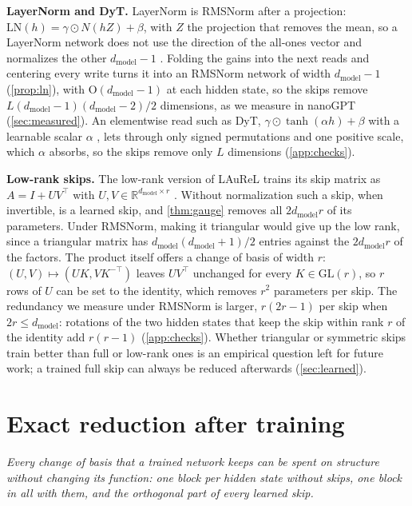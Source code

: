 \documentclass[10pt]{article}
\theoremstyle{definition}
\theoremstyle{remark}
\newcommand{\R}{\mathbb{R}}
\newcommand{\dm}{d_{\mathrm{model}}}
\newcommand{\GL}{\mathrm{GL}}
\newcommand{\Ort}{\mathrm{O}}
\newcommand{\para}[1]{\smallskip\noindent\textbf{#1}\hspace{0.5em}}
\newcommand{\takeaway}[1]{\noindent\textit{#1}\par\smallskip}
\begin{document}
\para{LayerNorm and DyT.} LayerNorm is RMSNorm after a projection: $\mathrm{LN}(h) = \gamma \odot N(hZ) + \beta$, with $Z$ the projection that removes the mean, so a LayerNorm network does not use the direction of the all-ones vector and normalizes the other $\dm - 1$ \citep{ashkboos2024slicegpt,theus2025glmc,baroni2026lnfree}. Folding the gains into the next reads and centering every write turns it into an RMSNorm network of width $\dm - 1$ (\cref{prop:ln}), with $\Ort(\dm-1)$ at each hidden state, so the skips remove $L(\dm-1)(\dm-2)/2$ dimensions, as we measure in nanoGPT (\cref{sec:measured}). An elementwise read such as DyT, $\gamma \odot \tanh(\alpha h) + \beta$ with a learnable scalar $\alpha$ \citep{zhu2025dyt}, lets through only signed permutations and one positive scale, which $\alpha$ absorbs, so the skips remove only $L$ dimensions (\cref{app:checks}).


\para{Low-rank skips.} The low-rank version of LAuReL trains its skip matrix as $A = I + UV^\top$ with $U, V \in \R^{\dm\times r}$ \citep{menghani2024laurel}. Without normalization such a skip, when invertible, is a learned skip, and \cref{thm:gauge} removes all $2\dm r$ of its parameters. Under RMSNorm, making it triangular would give up the low rank, since a triangular matrix has $\dm(\dm+1)/2$ entries against the $2\dm r$ of the factors. The product itself offers a change of basis of width $r$: $(U, V) \mapsto (UK, VK^{-\top})$ leaves $UV^\top$ unchanged for every $K \in \GL(r)$, so $r$ rows of $U$ can be set to the identity, which removes $r^2$ parameters per skip. The redundancy we measure under RMSNorm is larger, $r(2r-1)$ per skip when $2r \le \dm$: rotations of the two hidden states that keep the skip within rank $r$ of the identity add $r(r-1)$ (\cref{app:checks}). Whether triangular or symmetric skips train better than full or low-rank ones is an empirical question left for future work; a trained full skip can always be reduced afterwards (\cref{sec:learned}).

\section{Exact reduction after training}\label{sec:reduce}

\takeaway{Every change of basis that a trained network keeps can be spent on structure without changing its function: one block per hidden state without skips, one block in all with them, and the orthogonal part of every learned skip.}
\end{document}
